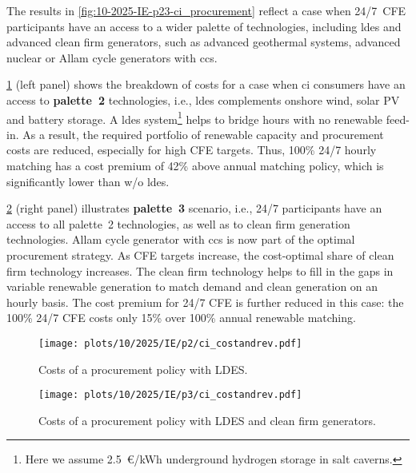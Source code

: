 The results in \cref{fig:10-2025-IE-p23-ci_procurement} reflect a case when 24/7~CFE participants have an access to a wider palette of technologies, including \gls{ldes} and advanced clean firm generators, such as advanced geothermal systems, advanced nuclear or Allam cycle generators with \gls{ccs}.

\cref{fig:10-2025-IE-p2-ci_costandrev} (left panel) shows the breakdown of costs for a case when \gls{ci} consumers have an access to \textbf{palette~2} technologies, i.e., \gls{ldes} complements onshore wind, solar PV and battery storage.
A \gls{ldes} system\footnote{Here we assume 2.5~\euro/kWh underground hydrogen storage in salt caverns.} helps to bridge hours with no renewable feed-in. 
As a result, the required portfolio of renewable capacity and procurement costs are reduced, especially for high CFE targets.
Thus, 100\% 24/7 hourly matching has a cost premium of 42\% above annual matching policy, which is significantly lower than w/o \gls{ldes}.

\cref{fig:10-2025-IE-p3-ci_costandrev} (right panel) illustrates \textbf{palette~3} scenario, i.e., 24/7 participants have an access to all palette~2 technologies, as well as to clean firm generation technologies.
Allam cycle generator with \gls{ccs} is now part of the optimal procurement strategy.
As CFE targets increase, the cost-optimal share of clean firm technology increases.
The clean firm technology helps to fill in the gaps in variable renewable generation to match demand and clean generation on an hourly basis.
The cost premium for 24/7 CFE is further reduced in this case: the 100\% 24/7 CFE costs only 15\% over 100\% annual renewable matching.

\begin{figure*}
    \centering
    \begin{subfigure}{0.5\textwidth}
        \centering
        \caption{Costs of a procurement policy with LDES.}
        \texttt{[image: plots/10/2025/IE/p2/ci\_costandrev.pdf]}
        \label{fig:10-2025-IE-p2-ci_costandrev}
    \end{subfigure}%
    \begin{subfigure}{0.5\textwidth}
        \centering
        \caption{Costs of a procurement policy with LDES and clean firm generators.}
        \texttt{[image: plots/10/2025/IE/p3/ci\_costandrev.pdf]}
        \label{fig:10-2025-IE-p3-ci_costandrev}
    \end{subfigure}
    \caption{The breakdown of costs per procurement policy if \gls{ci} consumers located in Ireland have an access to a wider palette of technologies:
    w/ \gls{ldes} (\cref{fig:10-2025-IE-p2-ci_costandrev});
    w/ \gls{ldes} and clean firm generation technologies (\cref{fig:10-2025-IE-p3-ci_costandrev}).
    }
    \label{fig:10-2025-IE-p23-ci_procurement}
\end{figure*}


